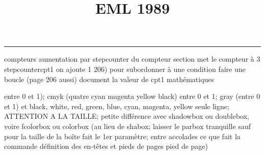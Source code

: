\documentclass[11pt]{article}%
\title{\bf \vspace{-2cm} EML 1989} %
\author{} %
\date{} %
\renewcommand{\headrulewidth}{0pt}%
\renewcommand{\footrulewidth}{0.4pt}%
\begin{document}
\maketitle %
\vspace{-1.4cm}\hrule %
\thispagestyle{fancy}

\vspace*{.2cm}



compteurs%
aumentation par stepcounter du compteur section%
met le compteur à 3%
stepcounter{cpt1} on ajoute 1%
206) pour subordonner à une condition %
faire une boucle (page 206 aussi) %
document la valeur de cpt1 
mathématiques\newcommand{\ch}{\operatorname{ch}} 
\newcommand{\sh}{\operatorname{sh}}
\renewcommand{\tanh}{\operatorname{th}}
\renewcommand{\sinh}{\operatorname{sh}}
\renewcommand{\cosh}{\operatorname{ch}}
\newcommand{\argsh}{\operatorname{argsh}}
\newcommand{\argch}{\operatorname{argch}}
\newcommand{\argth}{\operatorname{argth}}
\newcommand{\ker}{\operatorname{Ker}}
\renewcommand{\im}{\operatorname{Im}}
\newcommand{\rg}{\operatorname{rg}}
\newcommand{\Id}{\operatorname{Id}}
\newcommand{\id}{\operatorname{id}}
\renewcommand{\leq}{\leq}
\renewcommand{\geq}{\geq }

entre 0 et 1); cmyk (quatre cyan magenta yellow black) entre 0 et 1;
gray (entre 0 et 1) et black, white, red, green, blue, cyan, magenta,
yellow%
seule ligne; ATTENTION A LA TAILLE; petite différence avec shadowbox ou
doublebox, voire fcolorbox ou colorbox (au lieu de shabox; laisser le
parbox tranquille sauf pour la taille de la boîte
\newcommand{\Tbox}[1]{\begin{center} \shabox{\parbox{0.6
\linewidth}{#1}} \end{center}} %
fait le 1er paramètre; entre accolades ce que fait la commande
définition des en-têtes et pieds de pages\pagestyle{fancy}
\chead{}
\rfoot[ \ \thepage]{\thepage}
\cfoot{}
\lfoot{}
\thispagestyle{fancy} %
pied de page)\renewcommand{\footrulewidth}{0.4pt}
\renewcommand{\headrulewidth}{0.4pt}
\end{document}
